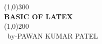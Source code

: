 \documentclass[a4paper,12pt]{article}
\begin{document}
\begin{titlepage} %
\begin{center} %
\line(1,0){300}\\%
\huge{\bfseries BASIC OF LATEX } \\
\line(1,0){200}\\ [2CM]
\ by-PAWAN KUMAR PATEL
\end{center}
\end{titlepage} %
\end{document}
